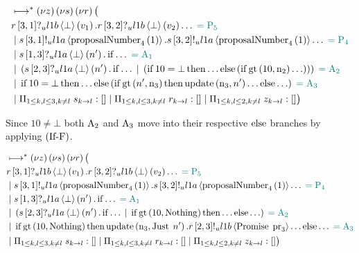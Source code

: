 \begin{align*}
&\mapstostar
\NuChannels \big (\\
&\ReceiveUnreliableP{\ChannelR}{3}{1}{\LOneB}{\bot}{v_1}.\ReceiveUnreliableP{\ChannelR}{3}{2}{\LOneB}{\bot}{v_2}\ldots \comment{= \Proposer{5}}\\
&\Or  \SendUnreliableP{\ChannelS}{3}{1}{\LOneA}{\proposalNumber{1}{4}}.\SendUnreliableP{\ChannelS}{3}{2}{\LOneA}{\proposalNumber{1}{4}}\ldots \comment{= \Proposer{4}}\\
&\Or  \ReceiveUnreliableP{\ChannelS}{1}{3}{\LOneA}{\bot}{n'}.\If{\ldots} \comment{=\Acceptor{1}}\\
&\Or
    \Paren{
        \ReceiveUnreliableP{\ChannelS}{2}{3}{\LOneA}{\bot}{n'}.\If{\ldots}
        \Or
            \Paren{
                \If{10 = \bot}
                \Then{\ldots}
                \Else{\Paren{
                    \If{\greaterThan{10}{\NumberRegister_2}} \ldots
                    }}
            }
    } \comment{=\Acceptor{2}}\\
&\Or \If{10 = \bot}
        \Then{\ldots}
        \Else{\Paren{
            \If{\greaterThan{n'}{\NumberRegister_3}}
            \Then{\update{\NumberRegister_3}{n'}\ldots}
            \Else{\ldots}
        }} \comment{=\Acceptor{3}}\\
&\Or \InnerSessionQueues{\ChannelS}
\Or \InnerSessionQueues{\ChannelR}
\Or \OuterSessionQueues
\big )
\end{align*}

Since $10 \neq \bot$ both $\Acceptor{2}$ and $\Acceptor{3}$ move into their respective $\Else$ branches by applying $\RIfF$.

\begin{align*}
&\mapstostar \NuChannels \big (\\
&\ReceiveUnreliableP{\ChannelR}{3}{1}{\LOneB}{\bot}{v_1}.\ReceiveUnreliableP{\ChannelR}{3}{2}{\LOneB}{\bot}{v_2}\ldots \comment{= \Proposer{5}}\\
&\Or \SendUnreliableP{\ChannelS}{3}{1}{\LOneA}{\proposalNumber{1}{4}}.\SendUnreliableP{\ChannelS}{3}{2}{\LOneA}{\proposalNumber{1}{4}}\ldots \comment{= \Proposer{4}}\\
&\Or \ReceiveUnreliableP{\ChannelS}{1}{3}{\LOneA}{\bot}{n'}.\If{\ldots} \comment{=\Acceptor{1}}\\
&\Or \Paren{
     \ReceiveUnreliableP{\ChannelS}{2}{3}{\LOneA}{\bot}{n'}.\If{\ldots}
    \Or  \If{\greaterThan{10}{\Nothing}} \Then{\ldots} \Else{\ldots}
} \comment{=\Acceptor{2}}\\
&\Or \If{\greaterThan{10}{\Nothing}} \Then{\update{\NumberRegister_3}{\Just{n'}} . \SendUnreliableP{\ChannelR}{2}{3}{\LOneB}{\Promise{\ProposalRegister_3}}\ldots} \Else{\ldots} \comment{=\Acceptor{3}}\\
&\Or \InnerSessionQueues{\ChannelS}
\Or \InnerSessionQueues{\ChannelR}
\Or \OuterSessionQueues
\big )
\end{align*}

